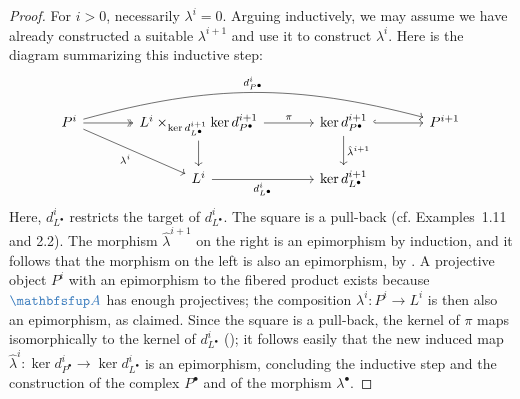 \begin{proof}
  For $i > 0$, necessarily $\lambda^i = 0$. Arguing inductively, we
  may assume we have already constructed a suitable $\lambda^{i+1}$
  and use it to construct $\lambda^i$. Here is the diagram summarizing
  this inductive step:
  \[\begin{tikzcd}[column sep=large]
      P^i \arrow[r, twoheadrightarrow] \arrow[rrr, "d_{P^\bullet}^i",
      bend left=15] \arrow[dr, "\lambda^i"'] & L^i \times_{\ker
        d_{L^\bullet}^{i+1}} \ker d_{P^\bullet}^{i+1} \arrow[r, "\pi"]
      \arrow[d] & \ker d_{P^\bullet}^{i+1} \arrow[r, hook]
      \arrow[d, "\hat\lambda^{i+1}"] & P^{i+1} \\
      & L^i \arrow[r, "d_{L^\bullet}^i"'] & \ker d_{L^\bullet}^{i+1} &
    \end{tikzcd}\] Here, $d^i_{L^\bullet}$ restricts the target of
  $d^i_{L^\bullet}$.  The square is a pull-back (cf. Examples~1.11 and
  2.2). The morphism $\hat\lambda^{i+1}$ on the right is an
  epimorphism by induction, and it follows that the morphism on the
  left is also an epimorphism, by . A projective
  object $P^i$ with an epimorphism to the fibered product exists
  because $\categ{A}$ has enough projectives; the composition
  $\lambda^i : P^i \to L^i$ is then also an epimorphism, as
  claimed. Since the square is a pull-back, the kernel of $\pi$ maps
  isomorphically to the kernel of $d^i_{L^\bullet}$
  (); it follows
  easily that the new induced map
  $\hat\lambda^i : \ker d^i_{P^\bullet} \to \ker d^i_{L^\bullet}$ is
  an epimorphism, concluding the inductive step and the construction
  of the complex $P^\bullet$ and of the morphism $\lambda^\bullet$.


\end{proof}
